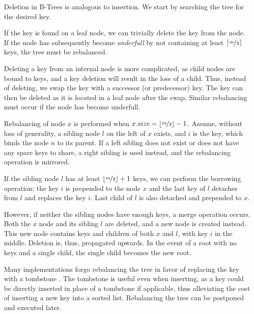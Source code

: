 Deletion in B-Trees is analogous to insertion. We start by searching the tree for the desired key.

If the key is found on a leaf node, we can trivially delete the key from the node. If the node has subsequently become \textit{underfull} by not containing at least $\lceil\nicefrac{m}{2}\rceil$ keys, the tree must be rebalanced.

Deleting a key from an internal node is more complicated, as child nodes are bound to keys, and a key deletion will result in the loss of a child. Thus, instead of deleting, we swap the key with a successor (or predecessor) key. The key can then be deleted as it is located in a leaf node after the swap. Similar rebalancing must occur if the node has become underfull.

Rebalancing of node $x$ is performed when $x.size = \lfloor\nicefrac{m}{2}\rfloor - 1$. Assume, without loss of generality, a sibling node $l$ on the left of $x$ exists, and $i$ is the key, which binds the node $n$ to its parent. If a left sibling does not exist or does not have any spare keys to share, a right sibling is used instead, and the rebalancing operation is mirrored.

If the sibling node $l$ has at least $\lfloor\nicefrac{m}{2}\rfloor + 1$ keys, we can perform the borrowing operation; the key $i$ is prepended to the node $x$ and the last key of $l$ detaches from $l$ and replaces the key $i$. Last child of $l$ is also detached and prepended to $x$.

However, if neither the sibling nodes have enough keys, a merge operation occurs. Both the $x$ node and its sibling $l$ are deleted, and a new node is created instead. This new node contains keys and children of both $x$ and $l$, with key $i$ in the middle. Deletion is, thus, propagated upwards. In the event of a root with no keys and a single child, the single child becomes the new root.

Many implementations forgo rebalancing the tree in favor of replacing the key with a tombstone \cite{goetz-tech}. The tombstone is useful even when inserting, as a key could be directly inserted in place of a tombstone if applicable, thus alleviating the cost of inserting a new key into a sorted list. Rebalancing the tree can be postponed and executed later.

